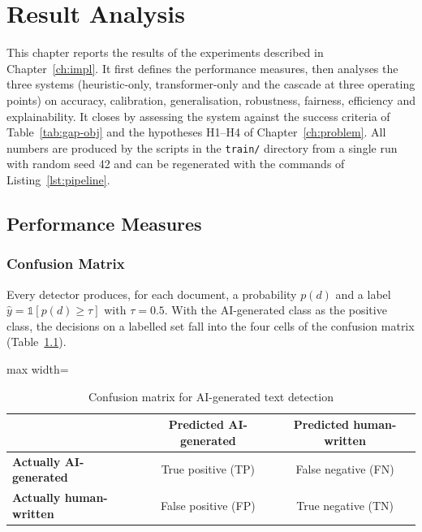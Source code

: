 \chapter{Result Analysis}
\label{ch:results}

This chapter reports the results of the experiments described in
Chapter~\ref{ch:impl}. It first defines the performance measures, then
analyses the three systems (heuristic-only, transformer-only and the cascade
at three operating points) on accuracy, calibration, generalisation,
robustness, fairness, efficiency and explainability. It closes by assessing
the system against the success criteria of Table~\ref{tab:gap-obj} and the
hypotheses H1--H4 of Chapter~\ref{ch:problem}. All numbers are produced by the
scripts in the \texttt{train/} directory from a single run with random seed 42
and can be regenerated with the commands of Listing~\ref{lst:pipeline}.

\section{Performance Measures}
\label{sec:measures}

\subsection{Confusion Matrix}

Every detector produces, for each document, a probability $p(d)$ and a label
$\hat{y} = \mathbb{1}[p(d) \ge \tau]$ with $\tau = 0.5$. With the AI-generated
class as the positive class, the decisions on a labelled set fall into the four
cells of the confusion matrix (Table~\ref{tab:confusiondef}).

\begin{table}[H]
\caption{Confusion matrix for AI-generated text detection}
\label{tab:confusiondef}
\centering
\small
\begin{adjustbox}{max width=\textwidth}\begin{tabular}{|l|c|c|}
\hline
 & \textbf{Predicted AI-generated} & \textbf{Predicted human-written} \\ \hline
\textbf{Actually AI-generated} & True positive (TP) & False negative (FN) \\ \hline
\textbf{Actually human-written} & False positive (FP) & True negative (TN) \\ \hline
\end{tabular}\end{adjustbox}
\end{table}

